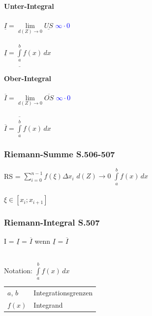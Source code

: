 		
		
		\begin{minipage}{0.45\linewidth}
		\textbf{Unter-Integral}		\\
		\\	
		$\underline{I} = \lim \limits_{d(Z) \rightarrow 0} \underline{US} $ \quad \textcolor{blue}{$\infty \cdot 0$} \\
		\\
		$\underline{I} =  \underline{\int \limits_{a}^{b}} f(x) \, dx $ \\
		
		\end{minipage}
		\hfill				
		\begin{minipage}{0.45\linewidth}
		
		
		\textbf{Ober-Integral}		\\
		\\	
		$\overline{I} = \lim \limits_{d(Z) \rightarrow 0} \overline{OS}$ \quad \textcolor{blue}{$\infty \cdot 0$} \\
		\\
		$\overline{I} =  \overline{\int \limits_{a}^{b}} f(x) \, dx $ \\

		\end{minipage}
		
		
		\subsubsection{Riemann-Summe S.506-507}
		RS = $\sum \limits_{i=0}^{n-1} f(\xi) \Delta x_i$  \quad $d(Z) \rightarrow 0 $ \quad $\int \limits_{a}^{b} f(x) \, dx$ \\
		\\
		$\xi \in [x_i ; x_{i+1}]$		
			
		
		\subsubsection{Riemann-Integral S.507}
		I = $\underline{I}$ = $\overline{I}$ wenn $\underline{I}$ = $\overline{I}$\\
		\\		
		\begin{minipage}{0.45\linewidth}
		Notation: $ \int \limits_{a}^{b} f(x)\, dx $
		\end{minipage}				
		\hfill
		\begin{minipage}{0.45\linewidth}
		\begin{tabular}{ll}
		$a$, $b$ & Integrationsgrenzen \\
		$f(x)$ & Integrand\\
		\end{tabular}
		\end{minipage}	
		
